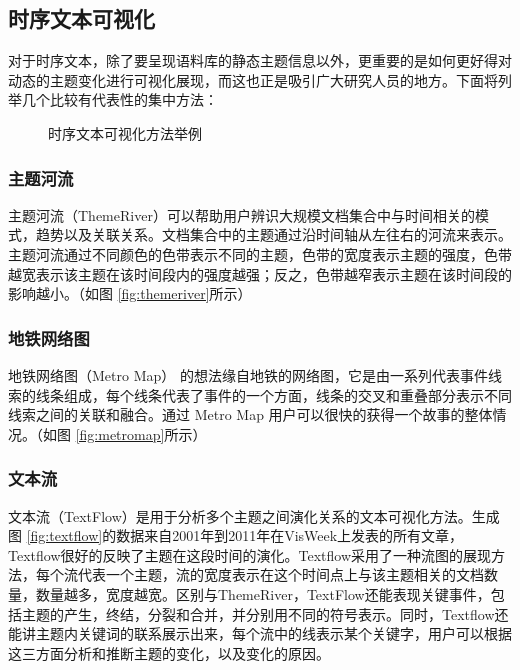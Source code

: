 \subsection{时序文本可视化}
对于时序文本，除了要呈现语料库的静态主题信息以外，更重要的是如何更好得对动态的主题变化进行可视化展现，而这也正是吸引广大研究人员的地方。下面将列举几个比较有代表性的集中方法：
\begin{figure}[htb]
    \centering
    
    \caption{时序文本可视化方法举例}
    \label{fig:temporal-theme-visual}
\end{figure}

\subsubsection{主题河流}
主题河流（ThemeRiver）\cite{Havre:2000}可以帮助用户辨识大规模文档集合中与时间相关的模式，趋势以及关联关系。文档集合中的主题通过沿时间轴从左往右的河流来表示。主题河流通过不同颜色的色带表示不同的主题，色带的宽度表示主题的强度，色带越宽表示该主题在该时间段内的强度越强；反之，色带越窄表示主题在该时间段的影响越小。（如图 \ref{fig:themeriver}所示）

\subsubsection{地铁网络图}
地铁网络图（Metro Map）\cite{shahaf2012trains} 的想法缘自地铁的网络图，它是由一系列代表事件线索的线条组成，每个线条代表了事件的一个方面，线条的交叉和重叠部分表示不同线索之间的关联和融合。通过 Metro Map 用户可以很快的获得一个故事的整体情况。（如图 \ref{fig:metromap}所示）

\subsubsection{文本流}
文本流（TextFlow）\cite{Weiwei:2011}是用于分析多个主题之间演化关系的文本可视化方法。生成图 \ref{fig:textflow}的数据来自2001年到2011年在VisWeek上发表的所有文章，Textflow很好的反映了主题在这段时间的演化。Textflow采用了一种流图的展现方法，每个流代表一个主题，流的宽度表示在这个时间点上与该主题相关的文档数量，数量越多，宽度越宽。区别与ThemeRiver，TextFlow还能表现关键事件，包括主题的产生，终结，分裂和合并，并分别用不同的符号表示。同时，Textflow还能讲主题内关键词的联系展示出来，每个流中的线表示某个关键字，用户可以根据这三方面分析和推断主题的变化，以及变化的原因。

